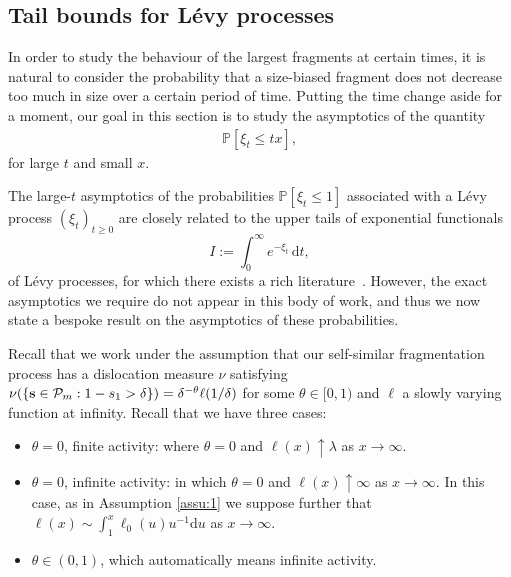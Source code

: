 \documentclass[a4,12pt]{amsart}
\numberwithin{equation}{section}
\newcommand{\MassP}{\mathcal{P}_{\rm m}}
\begin{document}
\subsection{Tail bounds for L\'evy processes} \label{sec:tail}
	In order to study the behaviour of the largest fragments at certain times,  
	it is natural to consider the probability that a size-biased fragment does not decrease  
	too much in size over a certain period of time.  
	Putting the time change aside for a moment, our goal in this section is to study the asymptotics of the quantity  
	\begin{align*}
		\mathbb{P}[\xi_t \leq tx],
	\end{align*}
	for large $t$ and small $x$. 

	The large-$t$ asymptotics of the probabilities $\mathbb{P}[\xi_t \leq 1]$  
	associated with a L\'evy process $(\xi_t)_{t \geq 0}$  
	are closely related to the upper tails of exponential functionals  
	\[
    		I := \int_0^\infty e^{-\xi_t} \, \mathrm{d}t,
	\]
	of L\'evy processes, for which there exists a rich literature~\cite{haas2021precise, rivero2003law}.  
	However, the exact asymptotics we require do not appear in this body of work,  
	and thus we now state a bespoke result on the asymptotics of these probabilities.  

	Recall that we work under the assumption that our self-similar fragmentation process 
	has a dislocation measure $\nu$ satisfying 
	$\nu( \{\mathbf{s}\in \MassP: 1 - s_1 > \delta \} ) = \delta^{-\theta} \ell(1/\delta)$ 
	for some $\theta \in [0,1)$ and $\ell$ a slowly varying function at infinity.
    Recall that we have three cases: 
    \begin{itemize}
    \item $\theta = 0$, finite activity: where $\theta = 0$ and $\ell(x) \uparrow \lambda$ as $x \to \infty$.
    \item $\theta = 0$, infinite activity: in which $\theta = 0$ and $\ell(x) \uparrow \infty$ as $x \to \infty$. In this case, as in Assumption \ref{assu:1} we suppose further that $\ell(x) \sim \int_1^x \ell_0(u)u^{-1}\mathrm{d}u$ as $x \to \infty$. 
    \item $\theta \in (0,1)$, which automatically means infinite activity.
    \end{itemize}
    
\end{document}
